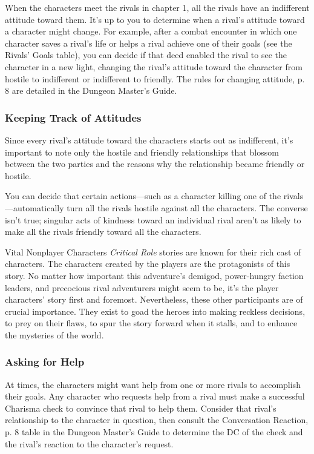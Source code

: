 \documentclass[a4paper, 11pt, bg=full, twocolumn, nooutline]{dndbook}
\begin{document}
When the characters meet the rivals in chapter 1, all the rivals have an indifferent attitude toward them. It's up to you to determine when a rival's attitude toward a character might change. For example, after a combat encounter in which one character saves a rival's life or helps a rival achieve one of their goals (see the Rivals' Goals table), you can decide if that deed enabled the rival to see the character in a new light, changing the rival's attitude toward the character from hostile to indifferent or indifferent to friendly. The rules for changing attitude, p. 8 are detailed in the Dungeon Master's Guide.

\subsubsection{Keeping Track of Attitudes}

Since every rival's attitude toward the characters starts out as indifferent, it's important to note only the hostile and friendly relationships that blossom between the two parties and the reasons why the relationship became friendly or hostile.

You can decide that certain actions---such as a character killing one of the rivals---automatically turn all the rivals hostile against all the characters. The converse isn't true; singular acts of kindness toward an individual rival aren't as likely to make all the rivals friendly toward all the characters.

\begin{DndSidebar}{Vital Nonplayer Characters}
\textit{Critical Role} stories are known for their rich cast of characters. The characters created by the players are the protagonists of this story. No matter how important this adventure's demigod, power-hungry faction leaders, and precocious rival adventurers might seem to be, it's the player characters' story first and foremost.
Nevertheless, these other participants are of crucial importance. They exist to goad the heroes into making reckless decisions, to prey on their flaws, to spur the story forward when it stalls, and to enhance the mysteries of the world.
\end{DndSidebar}

\subsubsection{Asking for Help}

At times, the characters might want help from one or more rivals to accomplish their goals. Any character who requests help from a rival must make a successful Charisma check to convince that rival to help them. Consider that rival's relationship to the character in question, then consult the Conversation Reaction, p. 8 table in the Dungeon Master's Guide to determine the DC of the check and the rival's reaction to the character's request.
\end{document}
